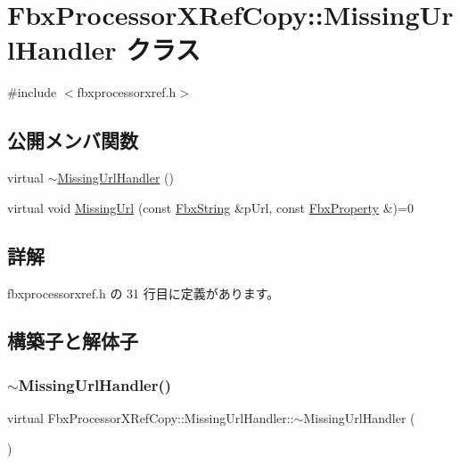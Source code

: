 \hypertarget{class_fbx_processor_x_ref_copy_1_1_missing_url_handler}{}\section{Fbx\+Processor\+X\+Ref\+Copy\+:\+:Missing\+Url\+Handler クラス}
\label{class_fbx_processor_x_ref_copy_1_1_missing_url_handler}


{\ttfamily \#include $<$fbxprocessorxref.\+h$>$}

\subsection*{公開メンバ関数}
\begin{DoxyCompactItemize}
\item 
virtual \hyperlink{class_fbx_processor_x_ref_copy_1_1_missing_url_handler_abfbeae2e370ac246814ad3ff04cd454f}{$\sim$\+Missing\+Url\+Handler} ()
\item 
virtual void \hyperlink{class_fbx_processor_x_ref_copy_1_1_missing_url_handler_aa1ccc43ba9aecf2345e282e63bf722f2}{Missing\+Url} (const \hyperlink{class_fbx_string}{Fbx\+String} \&p\+Url, const \hyperlink{class_fbx_property}{Fbx\+Property} \&)=0
\end{DoxyCompactItemize}


\subsection{詳解}


 fbxprocessorxref.\+h の 31 行目に定義があります。



\subsection{構築子と解体子}
\mbox{\label{class_fbx_processor_x_ref_copy_1_1_missing_url_handler_abfbeae2e370ac246814ad3ff04cd454f}} 
\subsubsection{\texorpdfstring{$\sim$\+Missing\+Url\+Handler()}{~MissingUrlHandler()}}
{\footnotesize\ttfamily virtual Fbx\+Processor\+X\+Ref\+Copy\+::\+Missing\+Url\+Handler\+::$\sim$\+Missing\+Url\+Handler (\begin{DoxyParamCaption}{ }\end{DoxyParamCaption})\hspace{0.3cm}{\ttfamily [virtual]}}



